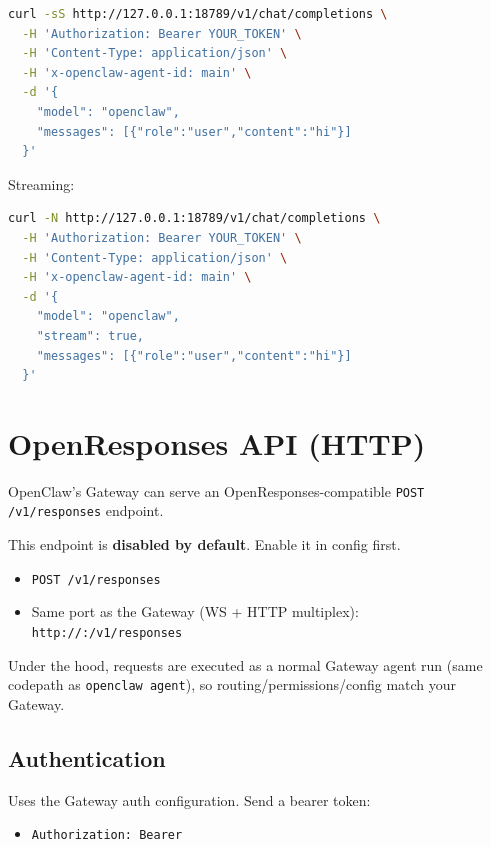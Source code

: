 \begin{lstlisting}[language=bash]
curl -sS http://127.0.0.1:18789/v1/chat/completions \
  -H 'Authorization: Bearer YOUR_TOKEN' \
  -H 'Content-Type: application/json' \
  -H 'x-openclaw-agent-id: main' \
  -d '{
    "model": "openclaw",
    "messages": [{"role":"user","content":"hi"}]
  }'
\end{lstlisting}


Streaming:

\begin{lstlisting}[language=bash]
curl -N http://127.0.0.1:18789/v1/chat/completions \
  -H 'Authorization: Bearer YOUR_TOKEN' \
  -H 'Content-Type: application/json' \
  -H 'x-openclaw-agent-id: main' \
  -d '{
    "model": "openclaw",
    "stream": true,
    "messages": [{"role":"user","content":"hi"}]
  }'
\end{lstlisting}



\clearpage

\section{OpenResponses API (HTTP)}


OpenClaw’s Gateway can serve an OpenResponses-compatible \texttt{POST /v1/responses} endpoint.

This endpoint is \textbf{disabled by default}. Enable it in config first.

\begin{itemize}
  \item \texttt{POST /v1/responses}
  \item Same port as the Gateway (WS + HTTP multiplex): \texttt{http://:/v1/responses}
\end{itemize}


Under the hood, requests are executed as a normal Gateway agent run (same codepath as
\texttt{openclaw agent}), so routing/permissions/config match your Gateway.

\subsection{Authentication}


Uses the Gateway auth configuration. Send a bearer token:

\begin{itemize}
  \item \texttt{Authorization: Bearer }
\end{itemize}


